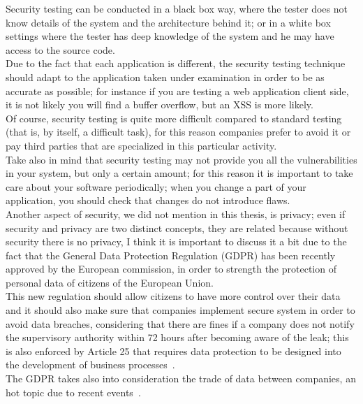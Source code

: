 Security testing can be conducted in a black box way, where the tester does not know details of the system and the architecture behind it; or
in a white box settings where the tester has deep knowledge of the system and he may have access to the source code.\\
Due to the fact that each application is different, the security testing technique should adapt to the application taken under examination in order
to be as accurate as possible; for instance if you are testing a web application client side, it is not likely you will find a buffer overflow, but 
an XSS is more likely.\\

Of course, security testing is quite more difficult compared to standard testing (that is, by itself, a difficult task), for this reason companies prefer to avoid it or pay third parties that are specialized in this particular activity.\\
Take also in mind that security testing may not provide you all the vulnerabilities in your system, but only a certain amount; for this reason it
is important to take care about your software periodically; when you change a part of your application, you should check that changes do not
introduce flaws.\\

Another aspect of security, we did not mention in this thesis, is privacy; even if security and privacy are two distinct concepts, they are related because without security there is no privacy, I think it is important to discuss it a bit due to the fact that the General Data Protection Regulation (GDPR)
has been recently approved by the European commission, in order to strength the protection of personal data of citizens of the European Union.\\
This new regulation should allow citizens to have more control over their data and it should also make sure that companies implement secure system
in order to avoid data breaches, considering that there are fines if a company does not notify the supervisory authority within 72 hours after becoming aware of the leak; this is also enforced by Article 25 that requires data protection to be designed into the development of business processes~\cite{wikica}.\\
The GDPR takes also into consideration the trade of data between companies, an hot topic due to recent events~\cite{ca}.\\


